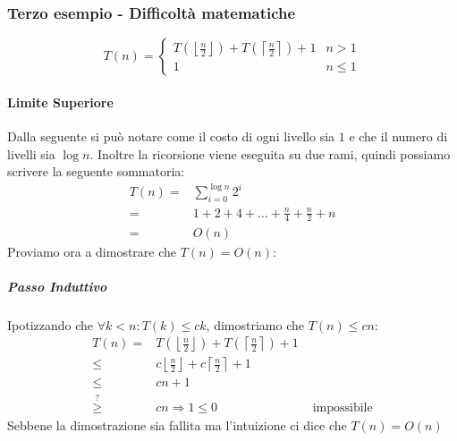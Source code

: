         \subsubsection{Terzo esempio - Difficoltà matematiche}
            $$
                T(n)=\begin{cases} T\left(\left\lfloor\frac{n}2\right\rfloor\right) + T\left(\left\lceil\frac{n}2\right\rceil\right) + 1 & n>1 \\ 1 & n\leq 1 \end{cases}
            $$
            \paragraph{Limite Superiore}
                Dalla seguente si può notare come il costo di ogni livello sia $ 1 $ e che il numero di livelli sia $ \log n $. Inoltre la ricorsione viene eseguita su due rami, quindi possiamo scrivere la seguente sommatoria:
                $$
                    \begin{aligned}
                        T(n)=&\sum_{i=0}^{\log n}2^i\\
                        =&1+2+4+\ldots+\frac{n}4+\frac{n}2+n \\
                        =&O(n)
                    \end{aligned}
                $$
                Proviamo ora a dimostrare che $ T(n) = O(n) $:
                \subparagraph{Passo Induttivo} Ipotizzando che $ \forall k<n:T(k)\leq ck $, dimostriamo che $ T(n)\leq cn $:
                    $$
                        \begin{aligned}
                            T(n)=&T\left(\left\lfloor\frac{n}2\right\rfloor\right) + T\left(\left\lceil\frac{n}2\right\rceil\right) + 1 \\
                            \leq & c\left\lfloor\frac{n}2\right\rfloor + c\left\lceil\frac{n}2\right\rceil + 1 \\
                            \leq & cn+1 \\
                            \stackrel{?}{\geq} & cn \Rightarrow 1\leq 0 & \text{ impossibile}
                        \end{aligned}
                    $$
                    Sebbene la dimostrazione sia fallita ma l'intuizione ci dice che $ T(n) = O(n) $

